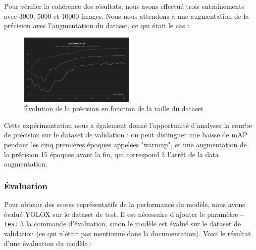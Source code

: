 Pour vérifier la cohérence des résultats, nous avons effectué trois entraînements avec 3000, 5000
et 10000 images. Nous nous attendons à une augmentation de la précision avec l'augmentation du dataset,
ce qui était le cas :

\begin{figure}[H]
    \centering
    \includegraphics[width=0.5\textwidth]{./img/dataset_size.png}
    \caption{Évolution de la précision en fonction de la taille du dataset}
\end{figure}

Cette expérimentation nous a également donné l'opportunité d'analyser la courbe de précision sur le dataset
de validation : on peut distinguer une baisse de mAP pendant les cinq premières époques appelées "warmup",
et une augmentation de la précision 15 époques avant la fin, qui correspond à l'arrêt de la data augmentation.\\

\subsubsection{Évaluation}

Pour obtenir des scores représentatifs de la performance du modèle, nous avons évalué YOLOX
sur le dataset de test. Il est nécessaire d'ajouter le paramètre \texttt{--test} à la commande
d'évaluation, sinon le modèle est évalué sur le dataset de validation (ce qui n'était pas mentionné
dans la documentation). Voici le résultat d'une évaluation du modèle :

